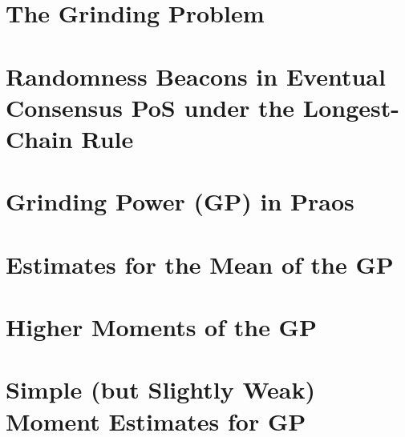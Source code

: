 


\chapter{The Grinding Problem}\label{sec:grinding-intro}


\chapter{Randomness Beacons in Eventual Consensus PoS under the Longest-Chain Rule}\label{sec:model-grinding}


% 

\chapter{Grinding Power (GP) in Praos}\label{sec:praos}






\chapter{Estimates for the Mean of the GP}\label{sec:praos-mean}



\chapter{Higher Moments of the GP}\label{sec:praos-higher-moments}



\chapter{Simple (but Slightly Weak) Moment Estimates for GP}\label{sec:praos-simple-moments}



